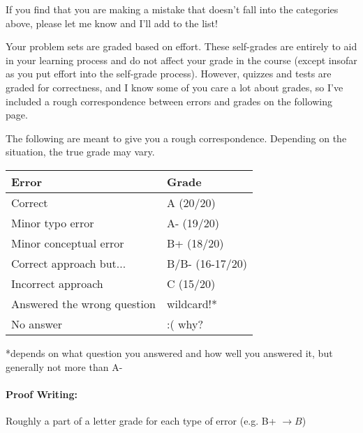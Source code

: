 \documentclass[12pt]{article}
\begin{document}
If you find that you are making a mistake that doesn't fall into the categories above, please let me know and I'll add to the list!


\vspace{1cm}

Your problem sets are graded based on effort. These self-grades are entirely to aid in your learning process and do not affect your grade in the course (except insofar as you put effort into the self-grade process). However, quizzes and tests are graded for correctness, and I
know some of you care a lot about grades, so I've included a rough correspondence between errors and grades on the following page. 

\newpage

The following are meant to give you a rough correspondence. Depending on the situation, the true grade may vary.


\begin{tabular}{|l|l|}
\hline
{\bf Error}& {\bf Grade}\\
\hline
  Correct &A (20/20)\\
  \hline 
  Minor typo error & A- (19/20)\\
  \hline
  Minor conceptual error &B+ (18/20)\\
  \hline
  Correct approach but...&B/B- (16-17/20)\\
  \hline
   Incorrect approach &C (15/20)\\
  \hline
  Answered the wrong question & wildcard!*  \\
  \hline
  No answer & :( why?  \\
  \hline
\end{tabular}
\bigskip



*depends on what question you answered and how well you answered it, but generally not more than A-

\paragraph{Proof Writing:} Roughly a part of a letter grade for each type of error (e.g. B+ $\rightarrow B$)
\end{document}
